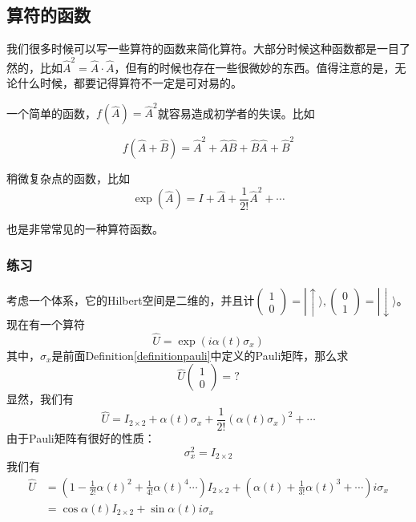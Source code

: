 \subsection{算符的函数}

我们很多时候可以写一些算符的函数来简化算符。大部分时候这种函数都是一目了然的，比如$\hat{A}^2 = \hat{A}\cdot\hat{A}$，但有的时候也存在一些很微妙的东西。值得注意的是，无论什么时候，都要记得算符不一定是可对易的。

一个简单的函数，$f(\hat{A}) = \hat{A}^2$就容易造成初学者的失误。比如

\begin{equation}
f(\hat{A}+\hat{B}) = \hat{A}^2 + \hat{A}\hat{B} + \hat{B}\hat{A} + \hat{B}^2
\end{equation}

稍微复杂点的函数，比如
\begin{equation}
\exp(\hat{A}) = I + \hat{A} + \frac{1}{2!}\hat{A}^2 + \cdots
\end{equation}

也是非常常见的一种算符函数。

\subsubsection{练习}
考虑一个体系，它的Hilbert空间是二维的，并且计$\left(\begin{matrix}1 \\0\end{matrix}\right) = |\uparrow\rangle, \left(\begin{matrix}0 \\1\end{matrix}\right) = |\downarrow\rangle$。现在有一个算符
\begin{equation}
\hat{U} = \exp\left(i\alpha(t) \sigma_x\right)
\end{equation}
其中，$\sigma_x$是前面Definition\ref{definitionpauli}中定义的Pauli矩阵，那么求
\begin{equation}
\hat{U} \left(\begin{matrix}1 \\0\end{matrix}\right) = ? 
\end{equation}
显然，我们有
\begin{equation}
\hat U= I_{2\times2} + \alpha(t) \sigma_x + \frac{1}{2!}\left(\alpha(t) \sigma_x\right)^2 + \cdots
\end{equation}
由于Pauli矩阵有很好的性质：
\begin{equation}
\sigma_x^2 = I_{2\times2}
\end{equation}
我们有
\begin{equation}
\begin{split}\hat U &= \left(1 - \frac{1}{2!}\alpha(t)^2 + \frac{1}{4!}\alpha(t)^4  \cdots\right)  I_{2\times2} + \left(\alpha(t) + \frac{1}{3!}\alpha(t)^3 + \cdots \right)i \sigma_x\\
& = \cos\alpha(t) I_{2\times2} + \sin\alpha(t) i\sigma_x 
\end{split}
\end{equation}

